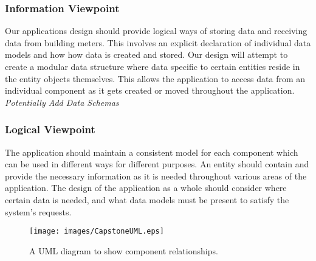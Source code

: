 \documentclass[journal,10pt,onecolumn,compsoc]{IEEEtran}
\begin{document}
    \subsubsection{Information Viewpoint}
    Our applications design should provide logical ways of storing data and receiving data from building meters. This involves an explicit declaration of individual data models and how how data is created and stored. Our design will attempt to create a modular data structure where data specific to certain entities reside in the entity objects themselves. This allows the application to access data from an individual component as it gets created or moved throughout the application.
    \textit{Potentially Add Data Schemas}

    \iffalse
    The Information viewpoint is applicable when there is a substantial persistent data content expected with the design subject.
        \begin{itemize}
            \item Concerns include persistent data structure, data content, data management strategies, data access schemes, and definition of metadata.
            \item Data items, data types and classes, data stores, and access mechanisms.
            \item The meaning and use of data elements should be specified.
            \item Description includes such things as static versus dynamic, whether it is to be shared by transactions, used as a control parameter, or used as a value, loop iteration count, pointer, or link field.
        \end{itemize}
    This section should relay how data is gathered from AcquiSuites, stored in a building object, and inherently passed to a block component to be organized and built into a graph. This section can also describe the data elements consistent for each data model (User, Building, Story, Dashboard). This viewpoint should aim to describe how our application keeps data consistent and modular through the use of Mongo Schema Models, and services to interact with each model.
    \fi
    \subsubsection{Logical Viewpoint}  
    The application should maintain a consistent model for each component which can be used in different ways for different purposes. An entity should contain and provide the necessary information as it is needed throughout various areas of the application. The design of the application as a whole should consider where certain data is needed, and what data models must be present to satisfy the system's requests.
    \begin{figure}[H]
        \centering
        \texttt{[image: images/CapstoneUML.eps]}
        \caption{A UML diagram to show component relationships.}
    \end{figure}
\end{document}
